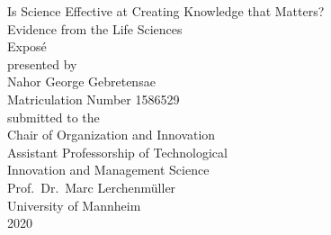 \documentclass{article}
\begin{document}
\begin{titlepage}
	\vspace*{2cm}
  \begin{center}
   {\Large Is Science Effective at Creating Knowledge that Matters?\\
	\small Evidence from the Life Sciences\\}
   \vspace{2cm} 
   {Exposé\\}
   \vspace{2cm}
   {presented by\\
    Nahor George Gebretensae\\
		Matriculation Number 1586529\\
   }
   \vspace{1cm} 
   {submitted to the\\
    Chair of Organization and Innovation\\
		Assistant Professorship of Technological\\
		Innovation and Management Science\\
    Prof.\ Dr.\ Marc Lerchenmüller\\
    University of Mannheim\\} 
		\vspace{1cm}
		\vspace{2cm}
   {2020}
  \end{center}
\end{titlepage}

\newpage
\tableofcontents
\newpage
\listoftables
\newpage
\end{document}

